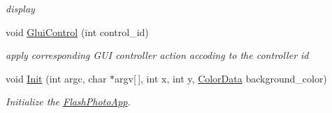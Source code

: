 \begin{DoxyCompactItemize}
\begin{DoxyCompactList}\small\item\em display \end{DoxyCompactList}\item 
void \hyperlink{classimage__tools_1_1FlashPhotoApp_a1cfe5fd1baf32a23264a6eff88987baf}{Glui\+Control} (int control\+\_\+id)
\begin{DoxyCompactList}\small\item\em apply corresponding G\+UI controller action accoding to the controller id \end{DoxyCompactList}\item 
void \hyperlink{classimage__tools_1_1FlashPhotoApp_a1bf24fa1a123732fe5d5e1964974dec1}{Init} (int argc, char $\ast$argv\mbox{[}$\,$\mbox{]}, int x, int y, \hyperlink{classimage__tools_1_1ColorData}{Color\+Data} background\+\_\+color)
\begin{DoxyCompactList}\small\item\em Initialize the \hyperlink{classimage__tools_1_1FlashPhotoApp}{Flash\+Photo\+App}. \end{DoxyCompactList}\end{DoxyCompactItemize}
